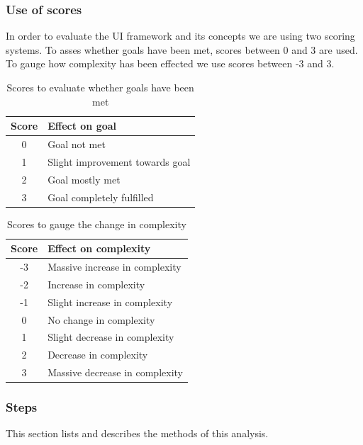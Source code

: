 \subsubsection{Use of scores}
In order to evaluate the UI framework and its concepts we are using two scoring systems. To asses whether goals have been met, scores between 0 and 3 are used. To gauge how complexity has been effected we use scores between -3 and 3.

\begin{table}[]
  \begin{center}
    \begin{tabular}{|c|l|}
      \hline
      Score & Effect on goal \\
      \hline
      0 & Goal not met \\
      1 & Slight improvement towards goal \\
      2 & Goal mostly met \\
      3 & Goal completely fulfilled \\
      \hline
    \end{tabular}
    \caption{Scores to evaluate whether goals have been met}
  \end{center}
\end{table}

\begin{table}[]
  \begin{center}
    \begin{tabular}{|c|l|}
      \hline
      Score & Effect on complexity \\
      \hline
      -3 & Massive increase in complexity \\
      -2 & Increase in complexity \\
      -1 & Slight increase in complexity \\
      0 & No change in complexity \\
      1 & Slight decrease in complexity \\
      2 & Decrease in complexity \\
      3 & Massive decrease in complexity \\
      \hline
    \end{tabular}
    \caption{Scores to gauge the change in complexity}
  \end{center}
\end{table}

\subsubsection{Steps}
This section lists and describes the methods of this analysis.

